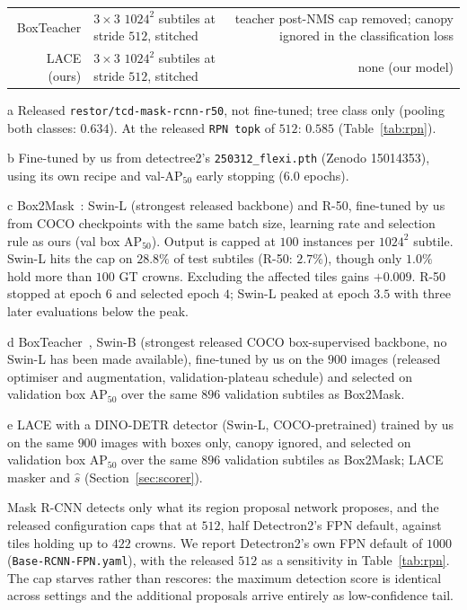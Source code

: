 \documentclass[remotesensing,article,submit,moreauthors]{Definitions/mdpi}
\begin{document}
\begin{table}[H]
\begin{threeparttable}
\begin{tabularx}{\textwidth}{RYD}
BoxTeacher & $3\times3$ $1024^2$ subtiles at stride $512$, stitched & teacher post-NMS cap removed; canopy ignored in the classification loss \\
LACE (ours) & $3\times3$ $1024^2$ subtiles at stride $512$, stitched & none (our model) \\
\bottomrule
\end{tabularx}
\begin{tablenotes}[flushleft]\footnotesize
\item[a] Released \texttt{restor/tcd-mask-rcnn-r50}, not fine-tuned; tree class only (pooling both classes: $0.634$). At the released \texttt{RPN topk} of $512$: $0.585$ (Table~\ref{tab:rpn}).
\item[b] Fine-tuned by us from detectree2's \texttt{250312\_flexi.pth} (Zenodo 15014353), using its own recipe and val-AP$_{50}$ early stopping ($6.0$ epochs).
\item[c] Box2Mask~\cite{box2mask}: Swin-L (strongest released backbone) and R-50, fine-tuned by us from COCO checkpoints with the same batch size, learning rate and selection rule as ours (val box AP$_{50}$). Output is capped at $100$ instances per $1024^2$ subtile. Swin-L hits the cap on $28.8\%$ of test subtiles (R-50: $2.7\%$), though only $1.0\%$ hold more than $100$ GT crowns. Excluding the affected tiles gains $+0.009$. R-50 stopped at epoch $6$ and selected epoch $4$; Swin-L peaked at epoch $3.5$ with three later evaluations below the peak.
\item[d] BoxTeacher~\cite{boxteacher}, Swin-B (strongest released COCO box-supervised backbone, no Swin-L has been made available), fine-tuned by us on the $900$ images (released optimiser and augmentation, validation-plateau schedule) and selected on validation box AP$_{50}$ over the same $896$ validation subtiles as Box2Mask.
\item[e] LACE with a DINO-DETR detector (Swin-L, COCO-pretrained) trained by us on the same $900$ images with boxes only, canopy ignored, and selected on validation box AP$_{50}$ over the same $896$ validation subtiles as Box2Mask; LACE masker and $\hat s$ (Section~\ref{sec:scorer}).
\end{tablenotes}
\end{threeparttable}
\end{table}

Mask R-CNN detects only what its region proposal network proposes, and the released configuration caps that at $512$, half Detectron2's FPN default, against tiles holding up to $422$ crowns. We report Detectron2's own FPN default of $1000$ (\texttt{Base-RCNN-FPN.yaml}), with the released $512$ as a sensitivity in Table~\ref{tab:rpn}. The cap starves rather than rescores: the maximum detection score is identical across settings and the additional proposals arrive entirely as low-confidence tail.
\end{document}
